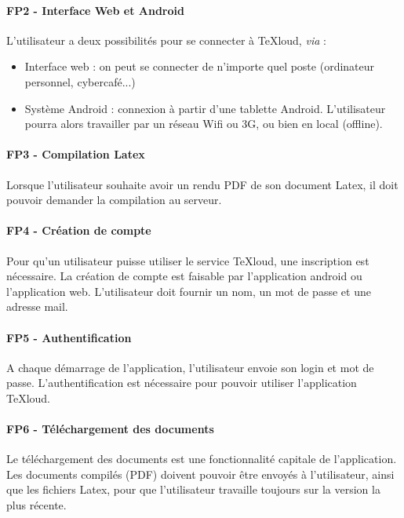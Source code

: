 \documentclass[a4paper,12pt]{article}
\begin{document}
\paragraph{FP2 - Interface Web et Android\\}
L'utilisateur a deux possibilités pour se connecter à TeXloud, \emph{via} :\\
\begin{itemize}
 \item Interface web : on peut se connecter de n'importe quel poste (ordinateur personnel, cybercafé...)
 \item Système Android : connexion à partir d'une tablette Android. L'utilisateur pourra alors 
travailler par un réseau Wifi ou 3G, ou bien en local (offline).
\end{itemize}

\paragraph{FP3 - Compilation Latex\\}
Lorsque l'utilisateur souhaite avoir un rendu PDF de son document Latex, il doit pouvoir demander 
la compilation au serveur.

\paragraph{FP4 - Création de compte\\}
Pour qu'un utilisateur puisse utiliser le service TeXloud, une inscription est nécessaire. La 
création de compte est faisable par l'application android ou l'application web. L'utilisateur doit
fournir un nom, un mot de passe et une adresse mail.

\paragraph{FP5 - Authentification\\}
A chaque démarrage de l'application, l'utilisateur envoie son login et mot de passe. L'authentification
est nécessaire pour pouvoir utiliser l'application TeXloud.

\paragraph{FP6 - Téléchargement des documents\\}
Le téléchargement des documents est une fonctionnalité capitale de l'application. Les documents 
compilés (PDF) doivent pouvoir être envoyés à l'utilisateur, ainsi que les fichiers Latex, pour que 
l'utilisateur travaille toujours sur la version la plus récente.
\end{document}

